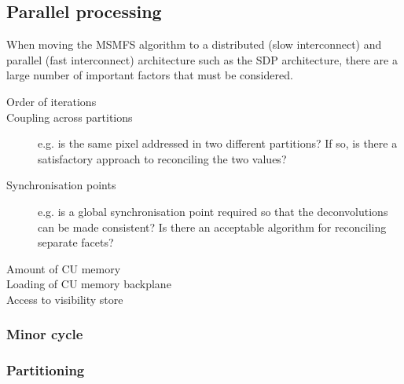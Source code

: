 \documentclass[11pt,a4paper]{article}
\begin{document}
%

\clearpage
\subsection{Parallel processing}
\label{sec:parallel}

When moving the MSMFS algorithm to a distributed (slow interconnect) and parallel (fast interconnect) architecture such as the SDP architecture, there are a large number of important factors that must be considered.
\begin{description}
\item[Order of iterations]
\item[Coupling across partitions] e.g. is the same pixel addressed in two different partitions? If so, is there a satisfactory approach to reconciling the two values?
\item[Synchronisation points] e.g. is a global synchronisation point required so that the deconvolutions can be made consistent? Is there an acceptable algorithm for reconciling separate facets?
\item[Amount of CU memory]
\item[Loading of CU memory backplane]
\item[Access to visibility store]
\end{description}

\subsubsection{Minor cycle}
\label{subsec:minorcycle}

\subsubsection{Partitioning}
\label{subsec:partitoning}
\end{document}
